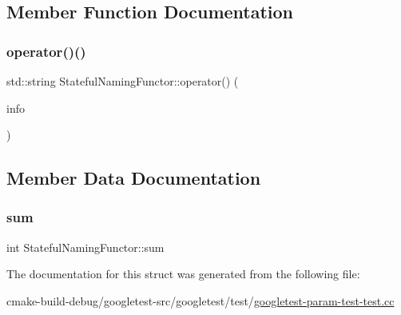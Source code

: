 \subsection{Member Function Documentation}
\mbox{\label{structStatefulNamingFunctor_a6a1d07c0b8314c1aee535f269ea536db}} 
\subsubsection{\texorpdfstring{operator()()}{operator()()}}
{\footnotesize\ttfamily std\+::string Stateful\+Naming\+Functor\+::operator() (\begin{DoxyParamCaption}\item[{const \+::\mbox{\hyperlink{structtesting_1_1TestParamInfo}{testing\+::\+Test\+Param\+Info}}$<$ int $>$ \&}]{info }\end{DoxyParamCaption})\hspace{0.3cm}{\ttfamily [inline]}}



\subsection{Member Data Documentation}
\mbox{\label{structStatefulNamingFunctor_a95887cf031d3113ae2edcd7617af3b79}} 
\subsubsection{\texorpdfstring{sum}{sum}}
{\footnotesize\ttfamily int Stateful\+Naming\+Functor\+::sum}



The documentation for this struct was generated from the following file\+:\begin{DoxyCompactItemize}
\item 
cmake-\/build-\/debug/googletest-\/src/googletest/test/\mbox{\hyperlink{googletest-param-test-test_8cc}{googletest-\/param-\/test-\/test.\+cc}}\end{DoxyCompactItemize}
